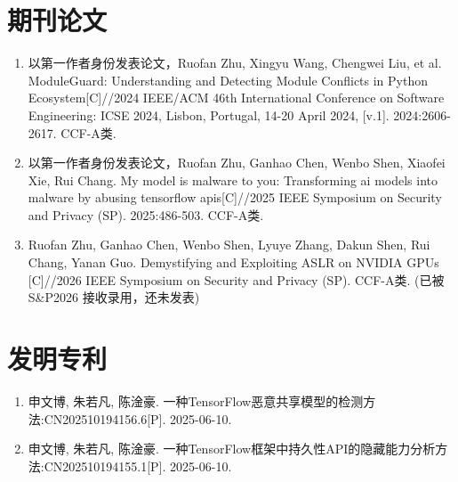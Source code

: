{%
    \section*{期刊论文}
    \begin{enumerate}
        \item 以第一作者身份发表论文，Ruofan Zhu, Xingyu Wang, Chengwei Liu, et al. ModuleGuard: Understanding and Detecting Module Conflicts in Python Ecosystem[C]//2024 IEEE/ACM 46th International Conference on Software Engineering: ICSE 2024, Lisbon, Portugal, 14-20 April 2024, [v.1]. 2024:2606-2617. CCF-A类.
        \item 以第一作者身份发表论文，Ruofan Zhu, Ganhao Chen, Wenbo Shen, Xiaofei Xie, Rui Chang. My model is malware to you: Transforming ai models into malware by abusing tensorflow apis[C]//2025 IEEE Symposium on Security and Privacy (SP). 2025:486-503. CCF-A类.
        \item Ruofan Zhu, Ganhao Chen, Wenbo Shen, Lyuye Zhang, Dakun Shen, Rui Chang, Yanan Guo. Demystifying and Exploiting ASLR on NVIDIA GPUs [C]//2026 IEEE Symposium on Security and Privacy (SP). CCF-A类. (已被 S\&P2026 接收录用，还未发表)
    \end{enumerate}


    \section*{发明专利}
    \begin{enumerate}
        \item 申文博, 朱若凡, 陈淦豪. 一种TensorFlow恶意共享模型的检测方法:CN202510194156.6[P]. 2025-06-10.
        \item 申文博, 朱若凡, 陈淦豪. 一种TensorFlow框架中持久性API的隐藏能力分析方法:CN202510194155.1[P]. 2025-06-10.
    \end{enumerate}
}
